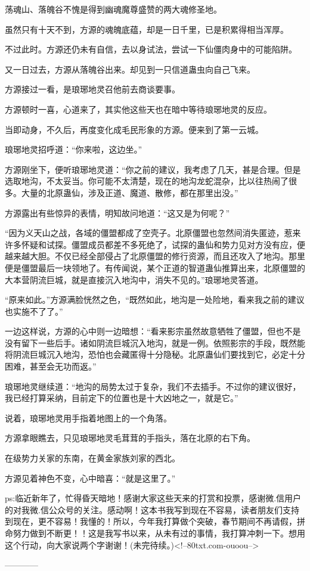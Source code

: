\begin{this_body}
荡魂山、落魄谷不愧是得到幽魂魔尊盛赞的两大魂修圣地。

虽然只有十天不到，方源的魂魄底蕴，却是一日千里，已是积累得相当浑厚。

不过此时。方源还仍未有自信，去以身试法，尝试一下仙僵肉身中的可能陷阱。

又一日过去，方源从落魄谷出来。却见到一只信道蛊虫向自己飞来。

方源接过一看，是琅琊地灵召他前去商谈要事。

方源顿时一喜，心道来了，其实他这些天也在暗中等待琅琊地灵的反应。

当即动身，不久后，再度变化成毛民形象的方源。便来到了第一云城。

琅琊地灵招呼道：“你来啦，这边坐。”

方源刚坐下，便听琅琊地灵道：“你之前的建议，我考虑了几天，甚是合理。但是选取地沟，不太妥当。你可能不太清楚，现在的地沟龙蛇混杂，比以往热闹了很多。大量的北原蛊仙，涉及正道、魔道、散修，都在那里出没。”

方源露出有些惊异的表情，明知故问地道：“这又是为何呢？”

“因为义天山之战，各域的僵盟都成了空壳子。北原僵盟也忽然间消失匿迹，惹来许多怀疑和试探。僵盟成员都差不多死绝了，试探的蛊仙和势力见对方没有应，便越来越大胆。不仅已经全部侵占了北原僵盟的修行资源，而且还攻入了地沟。那里便是僵盟最后一块领地了。有传闻说，某个正道的智道蛊仙推算出来，北原僵盟的大本营阴流巨城，就是直接沉入地沟中，消失不见的。”琅琊地灵答道。

“原来如此。”方源满脸恍然之色，“既然如此，地沟是一处险地，看来我之前的建议也实施不了了。”

一边这样说，方源的心中则一边暗想：“看来影宗虽然故意牺牲了僵盟，但也不是没有留下一些后手。诸如阴流巨城沉入地沟，就是一例。依照影宗的手段，既然能将阴流巨城沉入地沟，恐怕也会藏匿得十分隐秘。北原蛊仙们要找到它，必定十分困难，甚至会无功而返。”

琅琊地灵继续道：“地沟的局势太过于复杂，我们不去插手。不过你的建议很好，我已经打算采纳，目前定下的位置也是十大凶地之一，就是它。”

说着，琅琊地灵用手指着地图上的一个角落。

方源拿眼瞧去，只见琅琊地灵毛茸茸的手指头，落在北原的右下角。

在级势力关家的东南，在黄金家族刘家的西北。

方源见着神色不变，心中暗喜：“就是这里了。”

ps:临近新年了，忙得昏天暗地！感谢大家这些天来的打赏和投票，感谢微.信用户的对我微.信公众号的关注。感动啊！这本书我写到现在不容易，读者朋友们支持到现在，更不容易！我懂的！所以，今年我打算做个突破，春节期间不再请假，拼命努力做到不断更！！这是我写书以来，从未有过的事情，我打算冲刺一下。想用这个行动，向大家说两个字谢谢！(未完待续。)<!--80txt.com-ouoou-->

------------

\end{this_body}

